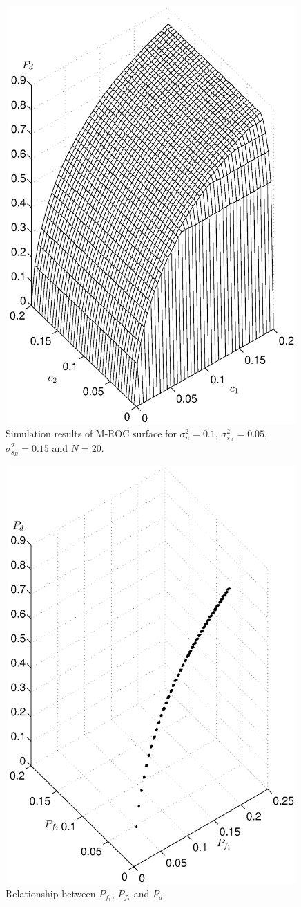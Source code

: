 \begin{figure}[!t]
\centering
\includegraphics[width=12cm, height=16cm]{4/c1c2pd.eps}
\caption{Simulation results of M-ROC surface for $\sigma_n^2 = 0.1$, $\sigma_{s_A}^2=0.05$, $\sigma_{s_B}^2=0.15$ and $N = 20$.}
\label{pic:2015may1}
\end{figure}

\begin{figure}[!t]
\centering
\includegraphics[width=12cm, height=16cm]{4/pdpf1pf2.eps}
\caption{Relationship between $P_{f_1}$, $P_{f_2}$ and $P_d$.}
\label{pic:2015may1a1}
\end{figure}

